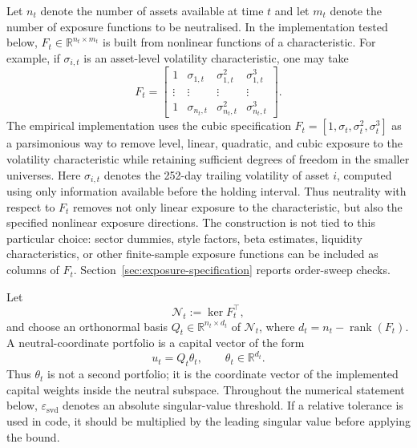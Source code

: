 \documentclass[11pt]{article}
\newcommand{\R}{\mathbb{R}}
\newcommand{\N}{\mathcal{N}}
\begin{document}
Let $n_t$ denote the number of assets available at time $t$ and let $m_t$ denote the number of exposure
functions to be neutralised.  In the implementation tested below, $F_t\in\R^{n_t\times m_t}$ is built
from nonlinear functions of a characteristic.  For example, if $\sigma_{i,t}$ is an asset-level volatility
characteristic, one may take
\begin{equation}
F_t =
\begin{bmatrix}
1 & \sigma_{1,t} & \sigma_{1,t}^2 & \sigma_{1,t}^3\\
\vdots & \vdots & \vdots & \vdots\\
1 & \sigma_{n_t,t} & \sigma_{n_t,t}^2 & \sigma_{n_t,t}^3
\end{bmatrix}.
\label{eq:exposure-matrix}
\end{equation}
The empirical implementation uses the cubic specification
$F_t=[1,\sigma_t,\sigma_t^2,\sigma_t^3]$ as a parsimonious way to remove level, linear, quadratic, and
cubic exposure to the volatility characteristic while retaining sufficient degrees of freedom in the
smaller universes. Here $\sigma_{i,t}$ denotes the 252-day trailing volatility of asset $i$, computed using
only information available before the holding interval. Thus neutrality with respect to $F_t$ removes not only linear exposure to the
characteristic, but also the specified nonlinear exposure directions. The construction is not tied to this
particular choice: sector dummies, style factors, beta estimates, liquidity characteristics, or other
finite-sample exposure functions can be included as columns of $F_t$. Section~\ref{sec:exposure-specification}
reports order-sweep checks.

Let
\[
        \N_t:=\ker F_t^\top,
\]
and choose an orthonormal basis $Q_t\in\R^{n_t\times d_t}$ of $\N_t$, where
$d_t=n_t-\operatorname{rank}(F_t)$.  A neutral-coordinate portfolio is a capital vector of the form
\begin{equation}
        u_t=Q_t\theta_t,\qquad \theta_t\in\R^{d_t}.
\end{equation}
Thus $\theta_t$ is not a second portfolio; it is the coordinate vector of the implemented capital weights
inside the neutral subspace.
Throughout the numerical statement below, $\varepsilon_{\mathrm{svd}}$ denotes an absolute singular-value
threshold.  If a relative tolerance is used in code, it should be multiplied by the leading singular value
before applying the bound.
\end{document}
